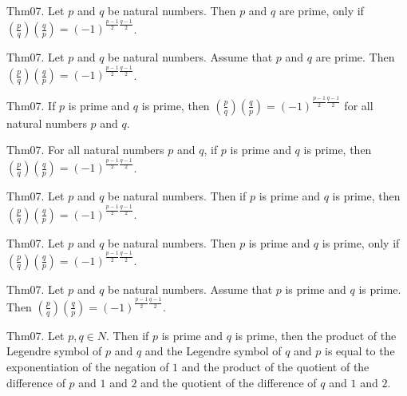 \documentclass{article}
\begin{document}
Thm07. Let $p$ and $q$ be natural numbers. Then $p$ and $q$ are prime, only if $\left(\frac{ p }{ q }\right) \left(\frac{ q }{ p }\right) = (- 1)^ {\frac{ p - 1}{2}\frac{ q - 1}{2}}$.

Thm07. Let $p$ and $q$ be natural numbers. Assume that $p$ and $q$ are prime. Then $\left(\frac{ p }{ q }\right) \left(\frac{ q }{ p }\right) = (- 1)^ {\frac{ p - 1}{2}\frac{ q - 1}{2}}$.

Thm07. If $p$ is prime and $q$ is prime, then $\left(\frac{ p }{ q }\right) \left(\frac{ q }{ p }\right) = (- 1)^ {\frac{ p - 1}{2}\frac{ q - 1}{2}}$ for all natural numbers $p$ and $q$.

Thm07. For all natural numbers $p$ and $q$, if $p$ is prime and $q$ is prime, then $\left(\frac{ p }{ q }\right) \left(\frac{ q }{ p }\right) = (- 1)^ {\frac{ p - 1}{2}\frac{ q - 1}{2}}$.

Thm07. Let $p$ and $q$ be natural numbers. Then if $p$ is prime and $q$ is prime, then $\left(\frac{ p }{ q }\right) \left(\frac{ q }{ p }\right) = (- 1)^ {\frac{ p - 1}{2}\frac{ q - 1}{2}}$.

Thm07. Let $p$ and $q$ be natural numbers. Then $p$ is prime and $q$ is prime, only if $\left(\frac{ p }{ q }\right) \left(\frac{ q }{ p }\right) = (- 1)^ {\frac{ p - 1}{2}\frac{ q - 1}{2}}$.

Thm07. Let $p$ and $q$ be natural numbers. Assume that $p$ is prime and $q$ is prime. Then $\left(\frac{ p }{ q }\right) \left(\frac{ q }{ p }\right) = (- 1)^ {\frac{ p - 1}{2}\frac{ q - 1}{2}}$.

Thm07. Let $p , q \in N$. Then if $p$ is prime and $q$ is prime, then the product of the Legendre symbol of $p$ and $q$ and the Legendre symbol of $q$ and $p$ is equal to the exponentiation of the negation of $1$ and the product of the quotient of the difference of $p$ and $1$ and $2$ and the quotient of the difference of $q$ and $1$ and $2$.
\end{document}

